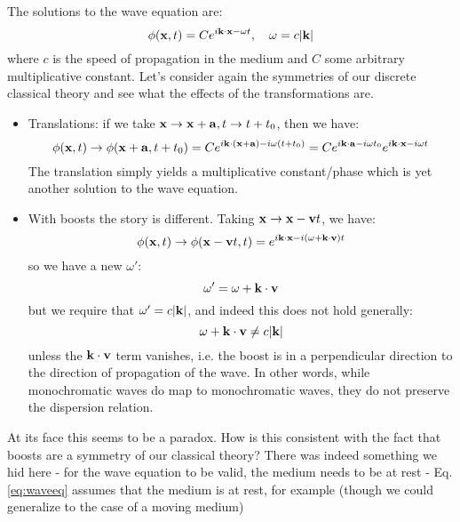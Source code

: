 The solutions to the wave equation are:
\begin{equation}
    \phi(\mathbf{x}, t) = Ce^{i\mathbf{k} \cdot \mathbf{x} - \omega t}, \quad \omega = c\lvert \mathbf{k} \rvert
\end{equation}
where $c$ is the speed of propagation in the medium and $C$ some arbitrary multiplicative constant. Let's consider again the symmetries of our discrete classical theory and see what the effects of the transformations are.
\begin{itemize}
    \item Translations: if we take $\mathbf{x} \to \mathbf{x} + \mathbf{a}, t \to t + t_0$, then we have:
    \begin{equation}
        \phi(\mathbf{x}, t) \to \phi(\mathbf{x} + \mathbf{a}, t + t_0) = Ce^{i\mathbf{k} \cdot(\mathbf{x} + \mathbf{a}) - i\omega(t + t_0)} = Ce^{i\mathbf{k} \cdot \mathbf{a} - i\omega t_0}e^{i\mathbf{k} \cdot \mathbf{x} - i\omega t}
    \end{equation}
    The translation simply yields a multiplicative constant/phase which is yet another solution to the wave equation.
    \item With boosts the story is different. Taking $\mathbf{x} \to \mathbf{x} - \mathbf{v}t$, we have:
    \begin{equation}
        \phi(\mathbf{x}, t) \to \phi(\mathbf{x} - \mathbf{v}t, t) = e^{i\mathbf{k} \cdot \mathbf{x} - i(\omega + \mathbf{k} \cdot \mathbf{v})t}
    \end{equation}
    so we have a new $\omega'$:
    \begin{equation}
        \omega' = \omega + \mathbf{k} \cdot \mathbf{v}
    \end{equation}
    but we require that $\omega' = c\lvert \mathbf{k} \rvert$, and indeed this does not hold generally:
    \begin{equation}
        \omega + \mathbf{k} \cdot \mathbf{v} \neq c\lvert \mathbf{k} \rvert
    \end{equation}
    unless the $\mathbf{k} \cdot \mathbf{v}$ term vanishes, i.e. the boost is in a perpendicular direction to the direction of propagation of the wave. In other words, while monochromatic waves do map to monochromatic waves, they do not preserve the dispersion relation.
\end{itemize}

At its face this seems to be a paradox. How is this consistent with the fact that boosts are a symmetry of our classical theory? There was indeed something we hid here - for the wave equation to be valid, the medium needs to be at rest - Eq. \eqref{eq:waveeq} assumes that the medium is at rest, for example (though we could generalize to the case of a moving medium)

